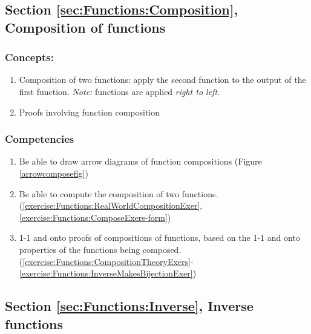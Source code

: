 \subsection*{Section \ref{sec:Functions:Composition}, Composition of functions}
\subsubsection*{Concepts:}
\begin{enumerate}
\item 
Composition of two functions: apply the second function to the output of the first function.  \emph{Note:} functions are applied \emph{right to left}.
\item
Proofs involving function composition
\end{enumerate}

\subsubsection*{Competencies}
\begin{enumerate}
\item
Be able to draw arrow diagrams of function compositions (Figure \ref{arrowcomposefig})
\item
Be able to compute the composition of two functions. (\ref{exercise:Functions:RealWorldCompositionExer}, \ref{exercise:Functions:ComposeExers-form})
\item
1-1 and onto proofs of compositions of functions, based on the 1-1 and onto properties of the functions being composed. (\ref{exercise:Functions:CompositionTheoryExers}-\ref{exercise:Functions:InverseMakesBijectionExer})
\end{enumerate}


\subsection*{Section \ref{sec:Functions:Inverse}, Inverse functions}
